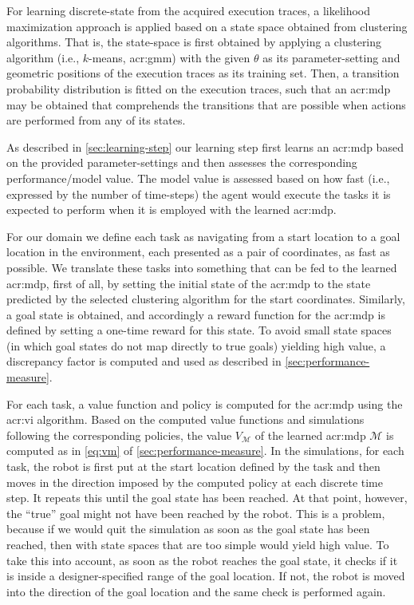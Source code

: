 For learning discrete-state  from the acquired execution traces, a likelihood maximization approach is applied based on a state space obtained from clustering algorithms.
That is, the state-space is first obtained by applying a clustering algorithm (i.e., $k$-means, \acrshort{acr:gmm}) with the given $\theta$ as its parameter-setting and geometric positions of the execution traces as its training set.
Then, a transition probability distribution is fitted on the execution traces, such that an \acrshort{acr:mdp} may be obtained that comprehends the transitions that are possible when actions are performed from any of its states.

As described in \autoref{sec:learning-step} our learning step first learns an \acrshort{acr:mdp} based on the provided parameter-settings and then assesses the corresponding performance/model value.
The model value is assessed based on how fast (i.e., expressed by the number of time-steps) the agent would execute the tasks it is expected to perform when it is employed with the learned \acrshort{acr:mdp}.

For our domain we define each task as navigating from a start location to a goal location in the environment, each presented as a pair of coordinates, as fast as possible.
We translate these tasks into something that can be fed to the learned \acrshort{acr:mdp}, first of all, by setting the initial state of the \acrshort{acr:mdp} to the state predicted by the selected clustering algorithm for the start coordinates.
Similarly, a goal state is obtained, and accordingly a reward function for the \acrshort{acr:mdp} is defined by setting a one-time reward for this state.
To avoid small state spaces (in which goal states do not map directly to true goals) yielding high value, a discrepancy factor is computed and used as described in \autoref{sec:performance-measure}.

For each task, a value function and policy is computed for the \acrshort{acr:mdp} using the \acrshort{acr:vi} algorithm.
Based on the computed value functions and simulations following the corresponding policies, the value $V_\mathcal{M}$ of the learned \acrshort{acr:mdp} $\mathcal{M}$ is computed as in \autoref{eq:vm} of \autoref{sec:performance-measure}.
In the simulations, for each task, the robot is first put at the start location defined by the task and then moves in the direction imposed by the computed policy at each discrete time step.
It repeats this until the goal state has been reached.
At that point, however, the ``true'' goal might not have been reached by the robot.
This is a problem, because if we would quit the simulation as soon as the goal state has been reached, then  with state spaces that are too simple would yield high value.
To take this into account, as soon as the robot reaches the goal state, it checks if it is inside a designer-specified range of the goal location.
If not, the robot is moved into the direction of the goal location and the same check is performed again.

